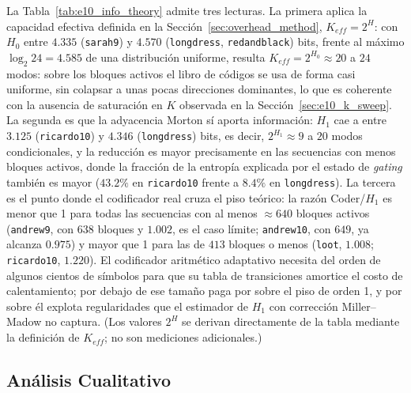         La Tabla~\ref{tab:e10_info_theory} admite tres lecturas. La primera aplica la capacidad
        efectiva definida en la Sección~\ref{sec:overhead_method}, $K_{eff}=2^{H}$: con $H_0$
        entre $4.335$ (\texttt{sarah9}) y $4.570$ (\texttt{longdress}, \texttt{redandblack})
        bits, frente al máximo $\log_2 24=4.585$ de una distribución uniforme, resulta
        $K_{eff}=2^{H_0}\approx20$ a $24$ modos: sobre los bloques activos el libro de códigos
        se usa de forma casi uniforme, sin colapsar a unas pocas direcciones dominantes, lo que
        es coherente con la ausencia de saturación en $K$ observada en la
        Sección~\ref{sec:e10_k_sweep}. La segunda es que la adyacencia Morton sí aporta
        información: $H_1$ cae a entre $3.125$ (\texttt{ricardo10}) y $4.346$
        (\texttt{longdress}) bits, es decir, $2^{H_1}\approx9$ a $20$ modos condicionales, y la
        reducción es mayor precisamente en las secuencias con menos bloques activos, donde la
        fracción de la entropía explicada por el estado de \textit{gating} también es mayor
        ($43.2\%$ en \texttt{ricardo10} frente a $8.4\%$ en \texttt{longdress}). La tercera es
        el punto donde el codificador real cruza el piso teórico: la razón Coder/$H_1$ es menor
        que 1 para todas las secuencias con al menos $\approx640$ bloques activos
        (\texttt{andrew9}, con $638$ bloques y $1.002$, es el caso límite; \texttt{andrew10},
        con $649$, ya alcanza $0.975$) y mayor que 1 para las de $413$ bloques o menos
        (\texttt{loot}, $1.008$; \texttt{ricardo10}, $1.220$). El codificador aritmético
        adaptativo necesita del orden de algunos cientos de símbolos para que su tabla de
        transiciones amortice el costo de calentamiento; por debajo de ese tamaño paga por sobre
        el piso de orden 1, y por sobre él explota regularidades que el estimador de $H_1$ con
        corrección Miller--Madow no captura. (Los valores $2^{H}$ se derivan directamente de la
        tabla mediante la definición de $K_{eff}$; no son mediciones adicionales.)



    \subsection{Análisis Cualitativo}
        \label{sec:e10_qualitative}

